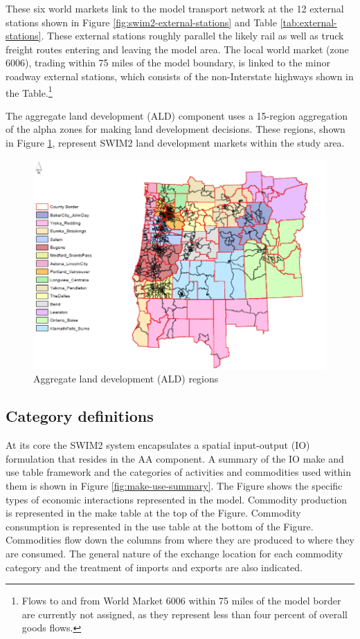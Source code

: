 These six world markets link to the model transport network at the 12 external stations shown in Figure \ref{fig:swim2-external-stations} and Table \ref{tab:external-stations}. These external stations roughly parallel the likely rail as well as truck freight routes entering and leaving the model area. The local world market (zone 6006), trading within 75 miles of the model boundary, is linked to the minor roadway external stations, which consists of the non-Interstate highways shown in the Table.\footnote{Flows to and from World Market 6006 within 75 miles of the model border are currently not assigned, as they represent less than four percent of overall goods flows.}


The aggregate land development (ALD) component uses a 15-region aggregation of the alpha zones for making land development decisions. These regions, shown in Figure \ref{fig:ald-regions}, represent SWIM2 land development markets within the study area.

\begin{figure}[!t]
\centering
\includegraphics[width=6.25in]{overview/ald-regions}
\caption{Aggregate land development (ALD) regions}
\label{fig:ald-regions}
\end{figure}

\subsection{Category definitions}\label{sec:category-definitions}
At its core the SWIM2 system encapsulates a spatial input-output (IO) formulation that resides in the AA component. A summary of the IO make and use table framework and the categories of activities and commodities used within them is shown in Figure \ref{fig:make-use-summary}. The Figure shows the specific types of economic interactions represented in the model. Commodity production is represented in the make table at the top of the Figure. Commodity consumption is represented in the use table at the bottom of the Figure. Commodities flow down the columns from where they are produced to where they are consumed. The general nature of the exchange location for each commodity category and the treatment of imports and exports are also indicated.

